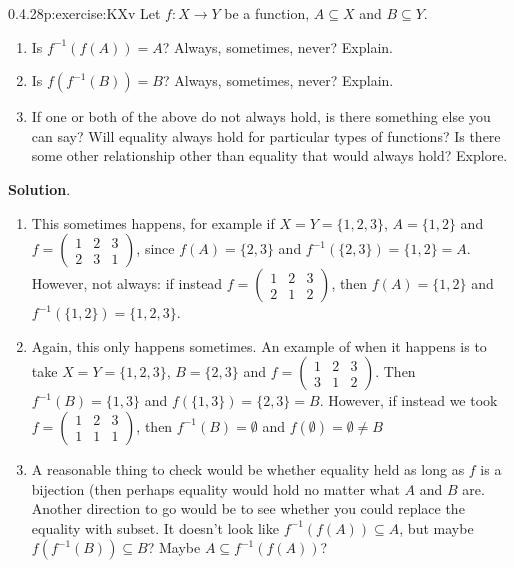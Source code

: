 \documentclass[twoside,11pt,]{book}
\newcommand{\blocktitlefont}{\relax}
\numberwithin{equation}{chapter}
\newcommand{\inv}{^{-1}}
\newcommand{\twoline}[2]{\begin{pmatrix}#1 \\ #2 \end{pmatrix}}
\newcommand{\amp}{&}
\begin{document}
\begin{divisionsolution}{0.4.28}{}{p:exercise:KXv}%
Let \(f:X \to Y\) be a function, \(A \subseteq X\) and \(B \subseteq Y\).%
\begin{enumerate}[label=(\alph*)]
\item{}Is \(f\inv\left(f(A)\right) = A\)? Always, sometimes, never? Explain.%
\item{}Is \(f\left(f\inv(B)\right) = B\)? Always, sometimes, never? Explain.%
\item{}If one or both of the above do not always hold, is there something else you can say? Will equality always hold for particular types of functions? Is there some other relationship other than equality that would always hold? Explore.%
\end{enumerate}
%
\par\smallskip%
\noindent\textbf{\blocktitlefont Solution}.\quad{}%
\begin{enumerate}[label=(\alph*)]
\item{}This sometimes happens, for example if \(X = Y = \{1,2,3\}\), \(A = \{1,2\}\) and \(f = \twoline{1 \amp 2 \amp 3}{2 \amp 3 \amp 1}\), since \(f(A) = \{2,3\}\) and \(f\inv(\{2,3\}) = \{1, 2\} = A\). However, not always: if instead \(f = \twoline{1\amp 2 \amp 3}{2 \amp 1 \amp 2}\), then \(f(A) = \{1,2\}\) and \(f\inv(\{1,2\}) = \{1,2,3\}\).%
\item{}Again, this only happens sometimes. An example of when it happens is to take \(X = Y = \{1,2,3\}\), \(B = \{2,3\}\) and \(f = \twoline{1\amp 2 \amp 3}{3\amp 1 \amp 2}\). Then \(f\inv(B) = \{1,3\}\) and \(f(\{1,3\}) = \{2, 3\} = B\). However, if instead we took \(f = \twoline{1 \amp 2 \amp 3}{1 \amp 1 \amp 1}\), then \(f\inv(B) = \emptyset\) and \(f(\emptyset) = \emptyset \ne B\)%
\item{}A reasonable thing to check would be whether equality held as long as \(f\) is a bijection (then perhaps equality would hold no matter what \(A\) and \(B\) are. Another direction to go would be to see whether you could replace the equality with subset. It doesn't look like \(f\inv(f(A)) \subseteq A\), but maybe \(f(f\inv(B)) \subseteq B\)? Maybe \(A \subseteq f\inv (f(A))\)?%
\end{enumerate}
%
\end{divisionsolution}%
\end{document}

